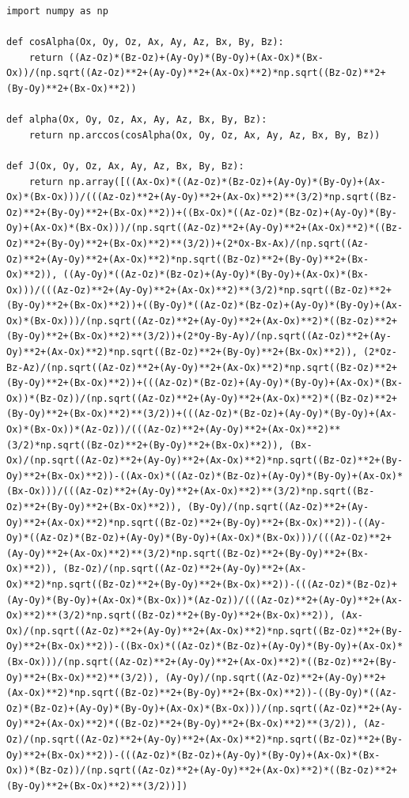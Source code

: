 \documentclass[french]{report}
\begin{document}
\begin{lstlisting}
import numpy as np

def cosAlpha(Ox, Oy, Oz, Ax, Ay, Az, Bx, By, Bz):
    return ((Az-Oz)*(Bz-Oz)+(Ay-Oy)*(By-Oy)+(Ax-Ox)*(Bx-Ox))/(np.sqrt((Az-Oz)**2+(Ay-Oy)**2+(Ax-Ox)**2)*np.sqrt((Bz-Oz)**2+(By-Oy)**2+(Bx-Ox)**2))

def alpha(Ox, Oy, Oz, Ax, Ay, Az, Bx, By, Bz):
    return np.arccos(cosAlpha(Ox, Oy, Oz, Ax, Ay, Az, Bx, By, Bz))

def J(Ox, Oy, Oz, Ax, Ay, Az, Bx, By, Bz):
    return np.array([((Ax-Ox)*((Az-Oz)*(Bz-Oz)+(Ay-Oy)*(By-Oy)+(Ax-Ox)*(Bx-Ox)))/(((Az-Oz)**2+(Ay-Oy)**2+(Ax-Ox)**2)**(3/2)*np.sqrt((Bz-Oz)**2+(By-Oy)**2+(Bx-Ox)**2))+((Bx-Ox)*((Az-Oz)*(Bz-Oz)+(Ay-Oy)*(By-Oy)+(Ax-Ox)*(Bx-Ox)))/(np.sqrt((Az-Oz)**2+(Ay-Oy)**2+(Ax-Ox)**2)*((Bz-Oz)**2+(By-Oy)**2+(Bx-Ox)**2)**(3/2))+(2*Ox-Bx-Ax)/(np.sqrt((Az-Oz)**2+(Ay-Oy)**2+(Ax-Ox)**2)*np.sqrt((Bz-Oz)**2+(By-Oy)**2+(Bx-Ox)**2)), ((Ay-Oy)*((Az-Oz)*(Bz-Oz)+(Ay-Oy)*(By-Oy)+(Ax-Ox)*(Bx-Ox)))/(((Az-Oz)**2+(Ay-Oy)**2+(Ax-Ox)**2)**(3/2)*np.sqrt((Bz-Oz)**2+(By-Oy)**2+(Bx-Ox)**2))+((By-Oy)*((Az-Oz)*(Bz-Oz)+(Ay-Oy)*(By-Oy)+(Ax-Ox)*(Bx-Ox)))/(np.sqrt((Az-Oz)**2+(Ay-Oy)**2+(Ax-Ox)**2)*((Bz-Oz)**2+(By-Oy)**2+(Bx-Ox)**2)**(3/2))+(2*Oy-By-Ay)/(np.sqrt((Az-Oz)**2+(Ay-Oy)**2+(Ax-Ox)**2)*np.sqrt((Bz-Oz)**2+(By-Oy)**2+(Bx-Ox)**2)), (2*Oz-Bz-Az)/(np.sqrt((Az-Oz)**2+(Ay-Oy)**2+(Ax-Ox)**2)*np.sqrt((Bz-Oz)**2+(By-Oy)**2+(Bx-Ox)**2))+(((Az-Oz)*(Bz-Oz)+(Ay-Oy)*(By-Oy)+(Ax-Ox)*(Bx-Ox))*(Bz-Oz))/(np.sqrt((Az-Oz)**2+(Ay-Oy)**2+(Ax-Ox)**2)*((Bz-Oz)**2+(By-Oy)**2+(Bx-Ox)**2)**(3/2))+(((Az-Oz)*(Bz-Oz)+(Ay-Oy)*(By-Oy)+(Ax-Ox)*(Bx-Ox))*(Az-Oz))/(((Az-Oz)**2+(Ay-Oy)**2+(Ax-Ox)**2)**(3/2)*np.sqrt((Bz-Oz)**2+(By-Oy)**2+(Bx-Ox)**2)), (Bx-Ox)/(np.sqrt((Az-Oz)**2+(Ay-Oy)**2+(Ax-Ox)**2)*np.sqrt((Bz-Oz)**2+(By-Oy)**2+(Bx-Ox)**2))-((Ax-Ox)*((Az-Oz)*(Bz-Oz)+(Ay-Oy)*(By-Oy)+(Ax-Ox)*(Bx-Ox)))/(((Az-Oz)**2+(Ay-Oy)**2+(Ax-Ox)**2)**(3/2)*np.sqrt((Bz-Oz)**2+(By-Oy)**2+(Bx-Ox)**2)), (By-Oy)/(np.sqrt((Az-Oz)**2+(Ay-Oy)**2+(Ax-Ox)**2)*np.sqrt((Bz-Oz)**2+(By-Oy)**2+(Bx-Ox)**2))-((Ay-Oy)*((Az-Oz)*(Bz-Oz)+(Ay-Oy)*(By-Oy)+(Ax-Ox)*(Bx-Ox)))/(((Az-Oz)**2+(Ay-Oy)**2+(Ax-Ox)**2)**(3/2)*np.sqrt((Bz-Oz)**2+(By-Oy)**2+(Bx-Ox)**2)), (Bz-Oz)/(np.sqrt((Az-Oz)**2+(Ay-Oy)**2+(Ax-Ox)**2)*np.sqrt((Bz-Oz)**2+(By-Oy)**2+(Bx-Ox)**2))-(((Az-Oz)*(Bz-Oz)+(Ay-Oy)*(By-Oy)+(Ax-Ox)*(Bx-Ox))*(Az-Oz))/(((Az-Oz)**2+(Ay-Oy)**2+(Ax-Ox)**2)**(3/2)*np.sqrt((Bz-Oz)**2+(By-Oy)**2+(Bx-Ox)**2)), (Ax-Ox)/(np.sqrt((Az-Oz)**2+(Ay-Oy)**2+(Ax-Ox)**2)*np.sqrt((Bz-Oz)**2+(By-Oy)**2+(Bx-Ox)**2))-((Bx-Ox)*((Az-Oz)*(Bz-Oz)+(Ay-Oy)*(By-Oy)+(Ax-Ox)*(Bx-Ox)))/(np.sqrt((Az-Oz)**2+(Ay-Oy)**2+(Ax-Ox)**2)*((Bz-Oz)**2+(By-Oy)**2+(Bx-Ox)**2)**(3/2)), (Ay-Oy)/(np.sqrt((Az-Oz)**2+(Ay-Oy)**2+(Ax-Ox)**2)*np.sqrt((Bz-Oz)**2+(By-Oy)**2+(Bx-Ox)**2))-((By-Oy)*((Az-Oz)*(Bz-Oz)+(Ay-Oy)*(By-Oy)+(Ax-Ox)*(Bx-Ox)))/(np.sqrt((Az-Oz)**2+(Ay-Oy)**2+(Ax-Ox)**2)*((Bz-Oz)**2+(By-Oy)**2+(Bx-Ox)**2)**(3/2)), (Az-Oz)/(np.sqrt((Az-Oz)**2+(Ay-Oy)**2+(Ax-Ox)**2)*np.sqrt((Bz-Oz)**2+(By-Oy)**2+(Bx-Ox)**2))-(((Az-Oz)*(Bz-Oz)+(Ay-Oy)*(By-Oy)+(Ax-Ox)*(Bx-Ox))*(Bz-Oz))/(np.sqrt((Az-Oz)**2+(Ay-Oy)**2+(Ax-Ox)**2)*((Bz-Oz)**2+(By-Oy)**2+(Bx-Ox)**2)**(3/2))])

\end{lstlisting}
\end{document}
